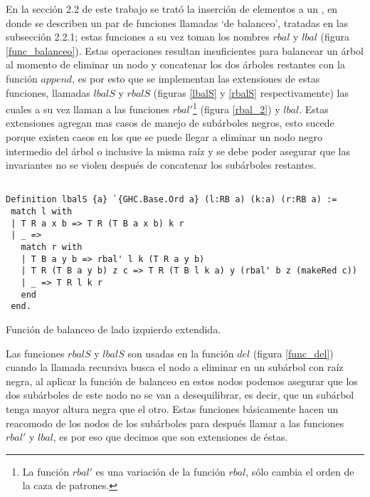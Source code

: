 En la secci\'on 2.2 de este trabajo se trat\'o la inserci\'on de elementos a un {\arn}, en donde se
describen un par de funciones llamadas `de balanceo', tratadas en las subsecci\'on 2.2.1; estas 
funciones a su vez toman los nombres \hyperref[func_balanceo]{$rbal$} y 
\hyperref[func_balanceo]{$lbal$} (figura \ref{func_balanceo}). Estas operaciones resultan 
insuficientes para balancear un \'arbol al momento de eliminar un nodo y concatenar los dos 
\'arboles restantes con la función \hyperref[func_app]{$append$}, es por esto que se implementan las
extensiones de estas funciones, llamadas \hyperref[lbalS]{$lbalS$} y \hyperref[lbalS]{$rbalS$} 
(figuras \ref{lbalS} y \ref{rbalS} respectivamente) las cuales a su vez llaman a las funciones 
\hyperref[rbal_2]{$rbal'$}\footnote{La funci\'on \hyperref[rbal_2]{$rbal'$} es una variación de la 
función \hyperref[func_balanceo]{$rbal$}, s\'olo cambia el orden de la caza de patrones.} (figura
\ref{rbal_2}) y \hyperref[func_balanceo]{$lbal$}. Estas extensiones agregan mas casos de manejo de 
subárboles negros, esto sucede porque existen casos en los que se puede llegar a eliminar un nodo 
negro intermedio del \'arbol o inclusive la misma ra\'iz y se debe poder asegurar que las invariantes 
no se violen después de concatenar los subárboles restantes.

\begin{listing}[!ht]
\centering
\captionsetup{justification=centering}
\begin{verbatim}

Definition lbalS {a} `{GHC.Base.Ord a} (l:RB a) (k:a) (r:RB a) :=
 match l with
 | T R a x b => T R (T B a x b) k r
 | _ =>
   match r with
   | T B a y b => rbal' l k (T R a y b)
   | T R (T B a y b) z c => T R (T B l k a) y (rbal' b z (makeRed c))
   | _ => T R l k r
   end
 end.

\end{verbatim}
\caption{Funci\'on de balanceo de lado izquierdo extendida.}
\label{lbalS}
\end{listing}

Las funciones \hyperref[lbalS]{$rbalS$} y \hyperref[lbalS]{$lbalS$} son usadas en la funci\'on 
\hyperref[func_del]{$del$} (figura \ref{func_del}) cuando la llamada recursiva busca el nodo a 
eliminar en un sub\'arbol con ra\'iz negra, al aplicar la funci\'on de balanceo en estos nodos 
podemos asegurar que los dos subárboles de este nodo no se van a desequilibrar, es decir, que un 
subárbol tenga mayor altura negra que el otro. Estas funciones b\'asicamente hacen un reacomodo de 
los nodos de los sub\'arboles para despu\'es llamar a las funciones \hyperref[rbal_2]{$rbal'$} y 
\hyperref[func_balanceo]{$lbal$}, es por eso que decimos que son extensiones de \'estas.


